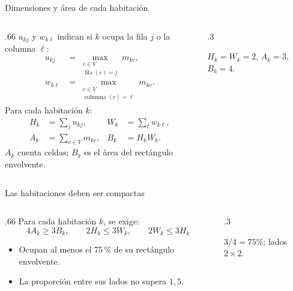 \documentclass[aspectratio=169,11pt]{beamer}
\newcommand{\examplegrid}{%
  \draw[step=1,ink!35] (0,0) grid (4,4);
  \draw[ink,thick] (0,0) rectangle (4,4);
}
\begin{document}
\begin{frame}{Dimensiones y \'area de cada habitaci\'on}
  \begin{columns}[T,onlytextwidth]
  \begin{column}{.66\textwidth}
  \small
  \(u_{kj}\) y \(w_{k\ell}\) indican si \(k\) ocupa la fila \(j\)
  o la columna \(\ell\):
  \[
    \begin{aligned}
      u_{kj}&=\max_{\substack{c\in V\\\operatorname{fila}(c)=j}}m_{kc},\\
      w_{k\ell}&=\max_{\substack{c\in V\\\operatorname{columna}(c)=\ell}}m_{kc}.
    \end{aligned}
  \]
  Para cada habitaci\'on \(k\):
  \[
    \begin{aligned}
      H_k&=\sum_j u_{kj},& W_k&=\sum_\ell w_{k\ell},\\
      A_k&=\sum_{c\in V}m_{kc},& B_k&=H_kW_k.
    \end{aligned}
  \]
  \small \(A_k\) cuenta celdas; \(B_k\) es el \'area del rect\'angulo
  envolvente.
  \end{column}
  \begin{column}{.3\textwidth}
    \centering
    \par\smallskip\scriptsize \(H_k=W_k=2\), \(A_k=3\), \(B_k=4\).
  \end{column}
  \end{columns}
\end{frame}

\begin{frame}{Las habitaciones deben ser compactas}
  \begin{columns}[T,onlytextwidth]
  \begin{column}{.66\textwidth}
  \small
  Para cada habitaci\'on \(k\), se exige:
  \[
    4A_k\geq3B_k,\qquad
    2H_k\leq3W_k,\qquad 2W_k\leq3H_k
  \]
  \begin{itemize}
    \setlength{\itemsep}{3mm}
    \item Ocupan al menos el 75\,\% de su rect\'angulo envolvente.
    \item La proporci\'on entre sus lados no supera \(1{,}5\).
  \end{itemize}
  \end{column}
  \begin{column}{.3\textwidth}
    \centering
    \par\smallskip\scriptsize \(3/4=75\%\); lados \(2\times2\).
  \end{column}
  \end{columns}
\end{frame}
\end{document}
